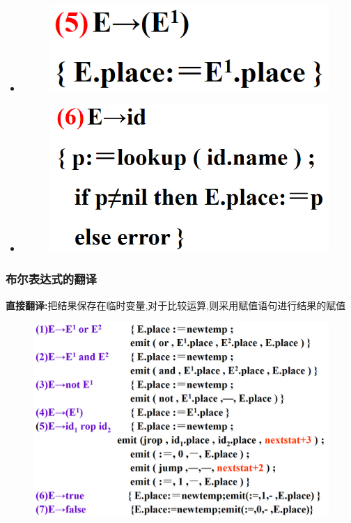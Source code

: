 \documentclass[UTF8,a4paper]{ctexart}
\begin{document}
\begin{itemize}
\begin{figure}[H]
        \end{figure}
  \item \begin{figure}[H]
         \centering
         \includegraphics[scale = 0.3]{assets/CompilerConstructionPrinciples_4cdaf.png}
        \end{figure}
  \item \begin{figure}[H]
         \centering
         \includegraphics[scale = 0.3]{assets/CompilerConstructionPrinciples_75972.png}
        \end{figure}
 \end{itemize}

 \subsubsection{布尔表达式的翻译}
 \textbf{直接翻译:}把结果保存在临时变量,对于比较运算,则采用赋值语句进行结果的赋值
 \begin{figure}[H]
  \centering
  \includegraphics[scale = 0.3]{assets/CompilerConstructionPrinciples_e815e.png}
 \end{figure}
\end{document}
